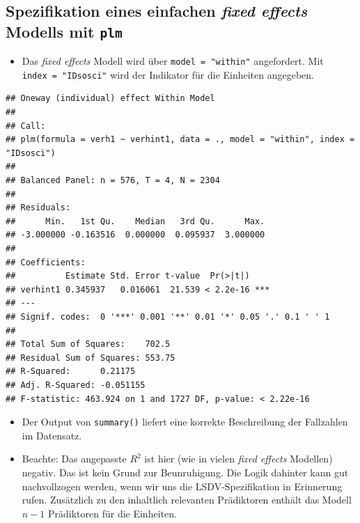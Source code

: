 \documentclass[
]{book}
\newenvironment{Shaded}{\begin{snugshade}}{\end{snugshade}}
\newcommand{\DataTypeTok}[1]{\textcolor[rgb]{0.13,0.29,0.53}{#1}}
\newcommand{\KeywordTok}[1]{\textcolor[rgb]{0.13,0.29,0.53}{\textbf{#1}}}
\newcommand{\NormalTok}[1]{#1}
\newcommand{\OperatorTok}[1]{\textcolor[rgb]{0.81,0.36,0.00}{\textbf{#1}}}
\newcommand{\StringTok}[1]{\textcolor[rgb]{0.31,0.60,0.02}{#1}}
\providecommand{\tightlist}{%
  \setlength{\itemsep}{0pt}\setlength{\parskip}{0pt}}
\begin{document}
\hypertarget{spezifikation-eines-einfachen-fixed-effects-modells-mit-plm}{%
\subsection*{\texorpdfstring{Spezifikation eines einfachen \emph{fixed effects} Modells mit \texttt{plm}}{Spezifikation eines einfachen fixed effects Modells mit plm}}\label{spezifikation-eines-einfachen-fixed-effects-modells-mit-plm}}

\begin{itemize}
\tightlist
\item
  Das \emph{fixed effects} Modell wird über \texttt{model\ =\ "within"} angefordert. Mit \texttt{index\ =\ "IDsosci"} wird der Indikator für die Einheiten angegeben.
\end{itemize}

\begin{Shaded}
\end{Shaded}

\begin{verbatim}
## Oneway (individual) effect Within Model
## 
## Call:
## plm(formula = verh1 ~ verhint1, data = ., model = "within", index = "IDsosci")
## 
## Balanced Panel: n = 576, T = 4, N = 2304
## 
## Residuals:
##      Min.   1st Qu.    Median   3rd Qu.      Max. 
## -3.000000 -0.163516  0.000000  0.095937  3.000000 
## 
## Coefficients:
##          Estimate Std. Error t-value  Pr(>|t|)    
## verhint1 0.345937   0.016061  21.539 < 2.2e-16 ***
## ---
## Signif. codes:  0 '***' 0.001 '**' 0.01 '*' 0.05 '.' 0.1 ' ' 1
## 
## Total Sum of Squares:    702.5
## Residual Sum of Squares: 553.75
## R-Squared:      0.21175
## Adj. R-Squared: -0.051155
## F-statistic: 463.924 on 1 and 1727 DF, p-value: < 2.22e-16
\end{verbatim}

\begin{itemize}
\tightlist
\item
  Der Output von \texttt{summary()} liefert eine korrekte Beschreibung der Fallzahlen im Datensatz.
\item
  Beachte: Das angepasste \(R^2\) ist hier (wie in vielen \emph{fixed effects} Modellen) negativ. Das ist kein Grund zur Beunruhigung. Die Logik dahinter kann gut nachvollzogen werden, wenn wir uns die LSDV-Spezifikation in Erinnerung rufen. Zusätzlich zu den inhaltlich relevanten Prädiktoren enthält das Modell \(n - 1\) Prädiktoren für die Einheiten.
\end{itemize}
\end{document}
